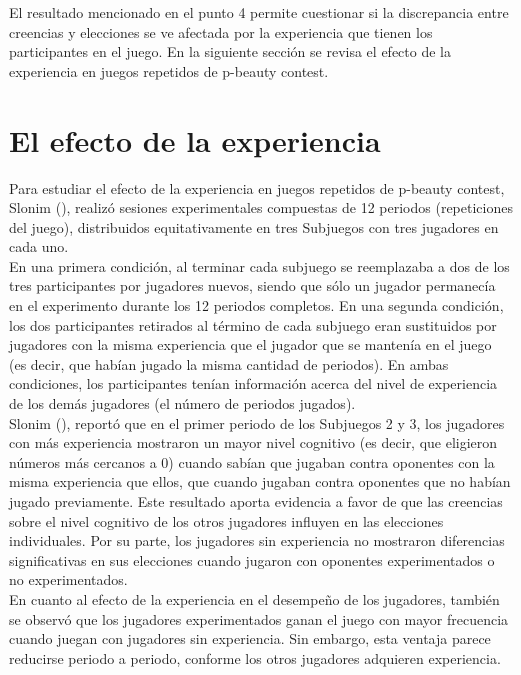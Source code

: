 El resultado mencionado en el punto 4 permite cuestionar si la discrepancia entre creencias y elecciones se ve afectada por la experiencia que tienen los participantes en el juego.  En la siguiente sección se revisa el efecto de la experiencia en juegos repetidos de p-beauty contest.\\

\section{El efecto de la experiencia}

Para estudiar el efecto de la experiencia en juegos repetidos de p-beauty contest, Slonim (\citeyear{Slonim}), realizó sesiones experimentales compuestas de 12 periodos (repeticiones del juego), distribuidos equitativamente en tres Subjuegos con tres jugadores en cada uno.\\

En una primera condición, al terminar cada subjuego se reemplazaba a dos de los tres participantes por jugadores nuevos, siendo que sólo un jugador permanecía en el experimento durante los 12 periodos completos. En una segunda condición, los dos participantes retirados al término de cada subjuego eran sustituidos por jugadores con la misma experiencia que el jugador que se mantenía en el juego (es decir, que habían jugado la misma cantidad de periodos). En ambas condiciones, los participantes tenían información acerca del nivel de experiencia de los demás jugadores (el número de periodos jugados).\\

Slonim (\citeyear{Slonim}), reportó que en el primer periodo de los Subjuegos 2 y 3, los jugadores con más experiencia mostraron un mayor nivel cognitivo (es decir, que eligieron números más cercanos a 0) cuando sabían que jugaban contra oponentes con la misma experiencia que ellos, que cuando jugaban contra oponentes que no habían jugado previamente. Este resultado aporta evidencia a favor de que las creencias sobre el nivel cognitivo de los otros jugadores influyen en las elecciones individuales. Por su parte, los jugadores sin experiencia no mostraron diferencias signiﬁcativas en sus elecciones cuando jugaron con oponentes experimentados o no experimentados.\\

En cuanto al efecto de la experiencia en el desempeño de los jugadores, también se observó que los jugadores experimentados ganan el juego con mayor frecuencia cuando juegan con jugadores sin experiencia. Sin embargo, esta ventaja parece reducirse periodo a periodo, conforme los otros jugadores adquieren experiencia.\\

